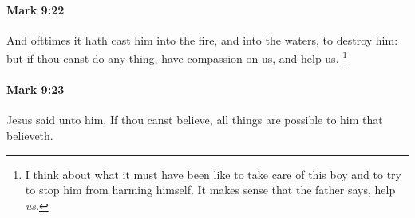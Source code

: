 		\paragraph{Mark 9:22} %
			\label{MARK-9-22}

			And ofttimes it hath cast him into the fire, and into the waters, to destroy him: but if thou canst do any thing, have compassion on us, and help us.%
				\footnote{%
					I think about what it must have been like to take care of this boy and to try to stop him from harming himself. It makes sense that the father says, help \textit{us}.
					}

			\begin{framed}
			\scriptsize
				\begin{compactdesc}
					\item[SBLG] 
				\end{compactdesc}
			\end{framed}

		\paragraph{Mark 9:23} %
			\label{MARK-9-23}

			Jesus said unto him, If thou canst believe, all things are possible to him that believeth.

